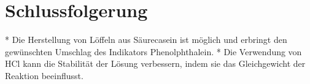 \documentclass{article}%
\begin{document}
%
\section{Schlussfolgerung}%
\label{sec:Schlussfolgerung}%
* Die Herstellung von Löffeln aus Säurecasein ist möglich und erbringt den gewünschten Umschlag des Indikators Phenolphthalein.
* Die Verwendung von HCl kann die Stabilität der Lösung verbessern, indem sie das Gleichgewicht der Reaktion beeinflusst.

%
\end{document}
